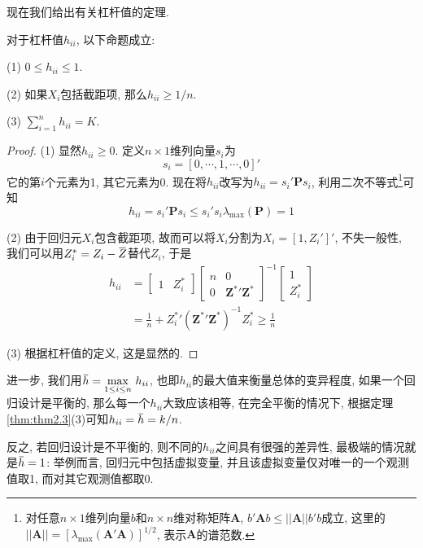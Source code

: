 \documentclass[cn, 12pt, math=mtpro2, bibstyle=apa, blue, twocol]{elegantbook}
\newcommand{\overbar}[1]{\mkern 1.5mu\overline{\mkern-1.5mu#1\mkern-1.5mu}\mkern 1.5mu}
\begin{document}
现在我们给出有关杠杆值的定理.
\begin{theorem}\label{thm:thm2.3}
  对于杠杆值$h_{ii}$, 以下命题成立:

  (1) $0\leq h_{ii}\leq1$.

  (2) 如果$X_i$包括截距项, 那么$h_{ii}\geq 1/n$.

  (3) $\sum_{i=1}^{n}h_{ii}=K$.
\end{theorem}
\begin{proof}
  (1) 显然$h_{ii}\geq0$. 定义$n\times1$维列向量$s_i$为
  $$s_i=[0,\cdots,1,\cdots,0]'$$
  它的第$i$个元素为1, 其它元素为0. 现在将$h_{ii}$改写为$h_{ii}=s_i'\mathbold{P}s_i$, 利用二次不等式\footnote{对任意$n\times1$维列向量$b$和$n\times n$维对称矩阵$\mathbold{A}$, $b'\mathbold{A}b\leq||\mathbold{A}||b'b$成立, 这里的$||\mathbold{A}||=[\lambda_{\max}(\mathbold{A}'\mathbold{A})]^{1/2}$, 表示$\mathbold{A}$的谱范数.}可知
  $$h_{ii}=s_i{'}\mathbold{P}s_i\leq s_i{'}s_i \lambda_{\max}(\mathbold{P})=1$$

  (2) 由于回归元$X_i$包含截距项, 故而可以将$X_i$分割为$X_i=[1,Z_i']'$, 不失一般性, 我们可以用$Z_i^\ast=Z_i-\overbar{Z}$替代$Z_i$, 于是
  \begin{align*}
  h_{ii}&=\begin{bmatrix}
             1 & Z_i^\ast
           \end{bmatrix}\begin{bmatrix}
                          n & 0 \\
                          0 & \mathbold{Z}^\ast{'}\mathbold{Z}^\ast
                        \end{bmatrix}^{-1}\begin{bmatrix}
                                            1 \\
                                            Z_i^\ast
                                          \end{bmatrix} \\
  &=\frac{1}{n}+Z_i^\ast{'}(\mathbold{Z}^\ast{'}\mathbold{Z}^\ast)^{-1}Z_i^\ast\geq\frac{1}{n}
  \end{align*}

  (3) 根据杠杆值的定义, 这是显然的.
\end{proof}
进一步, 我们用$\overbar{h}=\displaystyle\max_{1\leq i\leq n}\,h_{ii}$, 也即$h_{ii}$的最大值来衡量总体的变异程度, 如果一个回归设计是平衡的, 那么每一个$h_{ii}$大致应该相等, 在完全平衡的情况下, 根据定理\ref{thm:thm2.3}(3)可知$h_{ii}=\overbar{h}=k/n$.

反之, 若回归设计是不平衡的, 则不同的$h_{ii}$之间具有很强的差异性, 最极端的情况就是$\overbar{h}=1$: 举例而言, 回归元中包括虚拟变量, 并且该虚拟变量仅对唯一的一个观测值取1, 而对其它观测值都取0.
\end{document}
